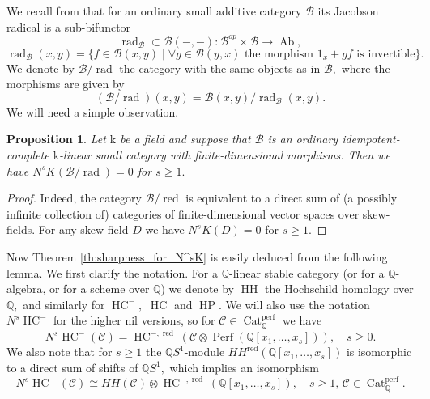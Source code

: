 \documentclass[11pt,leqno]{amsart}
\newtheorem{prop}[theo]{Proposition}
\numberwithin{equation}{section}
\def\Q{\mathbb{Q}}
\def\rad{\operatorname{rad}}
\newcommand{\Cat}{\operatorname{Cat}}
\newcommand{\red}{\operatorname{red}}
\newcommand{\mk}{\mathrm k}
\newcommand{\cB}{{\mathcal B}}
\newcommand{\cC}{{\mathcal C}}
\newcommand{\HH}{\operatorname{HH}}
\newcommand{\HC}{\operatorname{HC}}
\newcommand{\HP}{\operatorname{HP}}
\newcommand{\Ab}{\operatorname{Ab}}
\newcommand{\Perf}{\operatorname{Perf}}
\newcommand{\perf}{\operatorname{perf}}
\begin{document}
We recall from \cite{Ke64} that for an ordinary small additive category $\cB$ its Jacobson radical is a sub-bifunctor 
\begin{equation*}
\rad_{\cB}\subset\cB(-,-):\cB^{op}\times\cB\to\Ab,
\end{equation*} 
\begin{equation*}
\rad_{\cB}(x,y)=\{f\in\cB(x,y)\mid \forall g\in\cB(y,x)\text{ the morphism }1_x+gf\text{ is invertible}\}.
\end{equation*}
We denote by $\cB/\rad$ the category with the same objects as in $\cB,$ where the morphisms are given by
\begin{equation*}
(\cB/\rad)(x,y)=\cB(x,y)/\rad_{\cB}(x,y).
\end{equation*}
We will need a simple observation.

\begin{prop}\label{prop:vanishing_of_N^sK_of_quotient_by_radical}
Let $\mk$ be a field and suppose that $\cB$ is an ordinary idempotent-complete $\mk$-linear small category with finite-dimensional morphisms. Then we have $N^s K(\cB/\rad) = 0$ for $s\geq 1.$
\end{prop}

\begin{proof}
Indeed, the category $\cB/\red$ is equivalent to a direct sum of (a possibly infinite collection of) categories of finite-dimensional vector spaces over skew-fields. For any skew-field $D$ we have $N^s K(D) = 0$ for $s\geq 1.$
\end{proof}

Now Theorem \ref{th:sharpness_for_N^sK} is easily deduced from the following lemma. We first clarify the notation. For a $\Q$-linear stable category (or for a $\Q$-algebra, or for a scheme over $\Q$) we denote by $\HH$ the Hochschild homology over $\Q,$ and similarly for $\HC^-,$ $\HC$ and $\HP.$ We will also use the notation $N^s \HC^-$ for the higher nil versions, so for $\cC\in\Cat_{\Q}^{\perf}$ we have 
\begin{equation*}
N^s \HC^-(\cC)=\HC^{-,\red}(\cC\otimes\Perf(\Q[x_1,\dots,x_s])),\quad s\geq 0.
\end{equation*}
We also note that for $s\geq 1$ the $\Q S^1$-module $HH^{\red}(\Q[x_1,\dots,x_s])$ is isomorphic to a direct sum of shifts of $\Q S^1,$ which implies an isomorphism
\begin{equation*}
N^s \HC^-(\cC)\cong HH(\cC)\otimes \HC^{-,\red}(\Q[x_1,\dots,x_s]),\quad s\geq 1,\,\cC\in\Cat^{\perf}_{\Q}.
\end{equation*}
\end{document}
